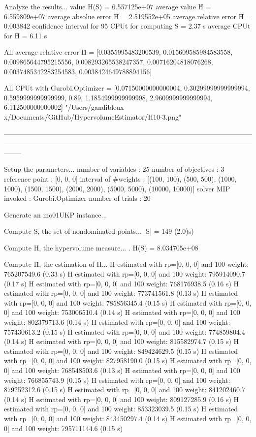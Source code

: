 Analyze the results...
  value H(S)                  = 6.557125e+07 
  average value H̃             = 6.559809e+07 
  average absolue error H̃     = 2.519552e+05 
  average relative error H̃    = 0.003842 
  confidence interval for 95%
  CPUt for computing S         = 2.37 s
  average CPUt for H̃           = 6.11 s

All average relative error H̃ = [0.0355995483200539, 0.015609585984583558, 0.009865644795215556, 0.008293265538247357, 0.00716204818076268, 0.0037485342283254583, 0.0038424649788894156]

All CPUt with Gurobi.Optimizer = [0.07150000000000004, 0.30299999999999994, 0.5959999999999999, 0.89, 1.1854999999999998, 2.9609999999999994, 6.112500000000002]
"/Users/gandibleux-x/Documents/GitHub/HypervolumeEstimator/H10-3.png"

--------------------------------------------------------------------------------------------------------------------------------------------------------------------------------------------------------------------------------

Setup the parameters...
  number of variables  : 25
  number of objectives : 3
  reference point      : [0, 0, 0]
  interval of #weights : [(100, 100), (500, 500), (1000, 1000), (1500, 1500), (2000, 2000), (5000, 5000), (10000, 10000)]
  solver MIP invoked   : Gurobi.Optimizer
  number of trials     : 20

Generate an mo01UKP instance...

Compute S, the set of nondominated points...
  |S|  = 149 (2.0)s)

Compute H, the hypervolume measure...
. H(S) = 8.034705e+08

Compute H̃, the estimation of H...
  H estimated with rp=[0, 0, 0] and 100 weight:  765207549.6  (0.33 s)
  H estimated with rp=[0, 0, 0] and 100 weight:  795914090.7  (0.17 s)
  H estimated with rp=[0, 0, 0] and 100 weight:  768176938.5  (0.16 s)
  H estimated with rp=[0, 0, 0] and 100 weight:  773741561.8  (0.13 s)
  H estimated with rp=[0, 0, 0] and 100 weight:  785856345.4  (0.15 s)
  H estimated with rp=[0, 0, 0] and 100 weight:  753006510.4  (0.14 s)
  H estimated with rp=[0, 0, 0] and 100 weight:  802379713.6  (0.14 s)
  H estimated with rp=[0, 0, 0] and 100 weight:  757430613.2  (0.15 s)
  H estimated with rp=[0, 0, 0] and 100 weight:  774859804.4  (0.14 s)
  H estimated with rp=[0, 0, 0] and 100 weight:  815582974.7  (0.15 s)
  H estimated with rp=[0, 0, 0] and 100 weight:  849424629.5  (0.15 s)
  H estimated with rp=[0, 0, 0] and 100 weight:  827958190.0  (0.15 s)
  H estimated with rp=[0, 0, 0] and 100 weight:  768548503.6  (0.13 s)
  H estimated with rp=[0, 0, 0] and 100 weight:  766855743.9  (0.15 s)
  H estimated with rp=[0, 0, 0] and 100 weight:  879252312.6  (0.15 s)
  H estimated with rp=[0, 0, 0] and 100 weight:  841202460.7  (0.14 s)
  H estimated with rp=[0, 0, 0] and 100 weight:  809127285.9  (0.16 s)
  H estimated with rp=[0, 0, 0] and 100 weight:  853323039.5  (0.15 s)
  H estimated with rp=[0, 0, 0] and 100 weight:  843450297.4  (0.14 s)
  H estimated with rp=[0, 0, 0] and 100 weight:  795711144.6  (0.15 s)

